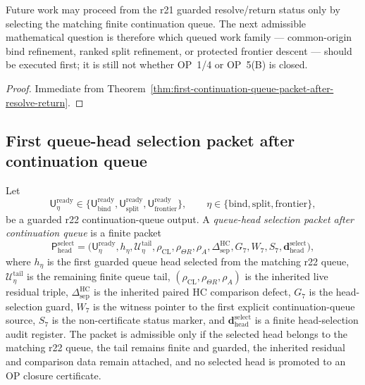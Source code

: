 \begin{corollary}
\label{cor:v3340-r22-working-rule}
Future work may proceed from the r21 guarded resolve/return status only by selecting the matching finite continuation queue.  The next admissible mathematical question is therefore which queued work family --- common-origin bind refinement, ranked split refinement, or protected frontier descent --- should be executed first; it is still not whether OP~1/4 or OP~5(B) is closed.
\end{corollary}

\begin{proof}
Immediate from Theorem~\ref{thm:first-continuation-queue-packet-after-resolve-return}.
\end{proof}


\subsection{First queue-head selection packet after continuation queue}
\label{subsec:first-queue-head-selection-packet-after-continuation-queue}

\begin{definition}
\label{def:queue-head-selection-packet-after-continuation-queue}
Let
\[
  \mathsf U_{\eta}^{\mathrm{ready}}
  \in
  \{\mathsf U_{\mathrm{bind}}^{\mathrm{ready}},
    \mathsf U_{\mathrm{split}}^{\mathrm{ready}},
    \mathsf U_{\mathrm{frontier}}^{\mathrm{ready}}\},
  \qquad
  \eta\in\{\mathrm{bind},\mathrm{split},\mathrm{frontier}\},
\]
be a guarded r22 continuation-queue output.  A \emph{queue-head selection packet after continuation queue} is a finite packet
\[
  \mathsf P_{\mathrm{head}}^{\mathrm{select}}
  =
  \bigl(
    \mathsf U_{\eta}^{\mathrm{ready}},
    h_{\eta},
    \mathcal U_{\eta}^{\mathrm{tail}},
    \rho_{\mathrm{CL}},\rho_{\Theta R},\rho_A,
    \Delta_{\mathrm{sep}}^{\mathrm{HC}},
    G_7,W_7,S_7,
    \mathbf d_{\mathrm{head}}^{\mathrm{select}}
  \bigr),
\]
where \(h_{\eta}\) is the first guarded queue head selected from the matching r22 queue, \(\mathcal U_{\eta}^{\mathrm{tail}}\) is the remaining finite queue tail, \((\rho_{\mathrm{CL}},\rho_{\Theta R},\rho_A)\) is the inherited live residual triple, \(\Delta_{\mathrm{sep}}^{\mathrm{HC}}\) is the inherited paired HC comparison defect, \(G_7\) is the head-selection guard, \(W_7\) is the witness pointer to the first explicit continuation-queue source, \(S_7\) is the non-certificate status marker, and \(\mathbf d_{\mathrm{head}}^{\mathrm{select}}\) is a finite head-selection audit register.  The packet is admissible only if the selected head belongs to the matching r22 queue, the tail remains finite and guarded, the inherited residual and comparison data remain attached, and no selected head is promoted to an OP closure certificate.
\end{definition}

